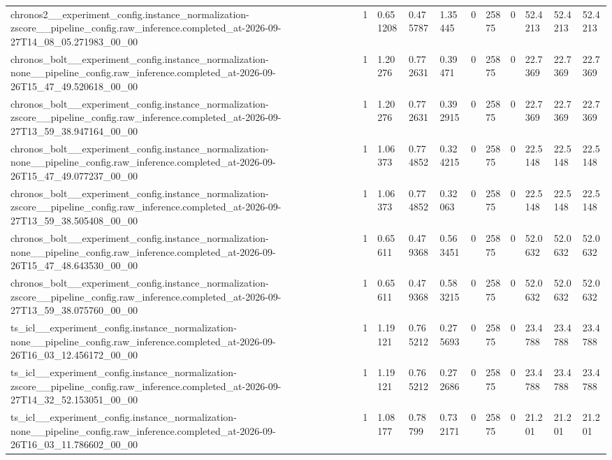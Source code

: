 \begin{tabular}{lllllllllll}
chronos2\_\_experiment\_config.instance\_normalization-zscore\_\_pipeline\_config.raw\_inference.completed\_at-2026-09-27T14\_08\_05.271983\_00\_00 & 1 & 0.651208 & 0.475787 & 1.35445 & 0 & 25875 & 0 & 52.4213 & 52.4213 & 52.4213 \\
chronos\_bolt\_\_experiment\_config.instance\_normalization-none\_\_pipeline\_config.raw\_inference.completed\_at-2026-09-26T15\_47\_49.520618\_00\_00 & 1 & 1.20276 & 0.772631 & 0.39471 & 0 & 25875 & 0 & 22.7369 & 22.7369 & 22.7369 \\
chronos\_bolt\_\_experiment\_config.instance\_normalization-zscore\_\_pipeline\_config.raw\_inference.completed\_at-2026-09-27T13\_59\_38.947164\_00\_00 & 1 & 1.20276 & 0.772631 & 0.392915 & 0 & 25875 & 0 & 22.7369 & 22.7369 & 22.7369 \\
chronos\_bolt\_\_experiment\_config.instance\_normalization-none\_\_pipeline\_config.raw\_inference.completed\_at-2026-09-26T15\_47\_49.077237\_00\_00 & 1 & 1.06373 & 0.774852 & 0.324215 & 0 & 25875 & 0 & 22.5148 & 22.5148 & 22.5148 \\
chronos\_bolt\_\_experiment\_config.instance\_normalization-zscore\_\_pipeline\_config.raw\_inference.completed\_at-2026-09-27T13\_59\_38.505408\_00\_00 & 1 & 1.06373 & 0.774852 & 0.32063 & 0 & 25875 & 0 & 22.5148 & 22.5148 & 22.5148 \\
chronos\_bolt\_\_experiment\_config.instance\_normalization-none\_\_pipeline\_config.raw\_inference.completed\_at-2026-09-26T15\_47\_48.643530\_00\_00 & 1 & 0.65611 & 0.479368 & 0.563451 & 0 & 25875 & 0 & 52.0632 & 52.0632 & 52.0632 \\
chronos\_bolt\_\_experiment\_config.instance\_normalization-zscore\_\_pipeline\_config.raw\_inference.completed\_at-2026-09-27T13\_59\_38.075760\_00\_00 & 1 & 0.65611 & 0.479368 & 0.583215 & 0 & 25875 & 0 & 52.0632 & 52.0632 & 52.0632 \\
ts\_icl\_\_experiment\_config.instance\_normalization-none\_\_pipeline\_config.raw\_inference.completed\_at-2026-09-26T16\_03\_12.456172\_00\_00 & 1 & 1.19121 & 0.765212 & 0.275693 & 0 & 25875 & 0 & 23.4788 & 23.4788 & 23.4788 \\
ts\_icl\_\_experiment\_config.instance\_normalization-zscore\_\_pipeline\_config.raw\_inference.completed\_at-2026-09-27T14\_32\_52.153051\_00\_00 & 1 & 1.19121 & 0.765212 & 0.272686 & 0 & 25875 & 0 & 23.4788 & 23.4788 & 23.4788 \\
ts\_icl\_\_experiment\_config.instance\_normalization-none\_\_pipeline\_config.raw\_inference.completed\_at-2026-09-26T16\_03\_11.786602\_00\_00 & 1 & 1.08177 & 0.78799 & 0.732171 & 0 & 25875 & 0 & 21.201 & 21.201 & 21.201 \\

\end{tabular}
